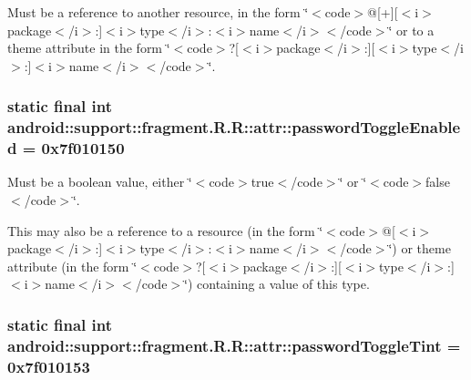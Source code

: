 Must be a reference to another resource, in the form \char`\"{}$<$code$>$@\mbox{[}+\mbox{]}\mbox{[}$<$i$>$package$<$/i$>$:\mbox{]}$<$i$>$type$<$/i$>$:$<$i$>$name$<$/i$>$$<$/code$>$\char`\"{} or to a theme attribute in the form \char`\"{}$<$code$>$?\mbox{[}$<$i$>$package$<$/i$>$:\mbox{]}\mbox{[}$<$i$>$type$<$/i$>$:\mbox{]}$<$i$>$name$<$/i$>$$<$/code$>$\char`\"{}. \hypertarget{classandroid_1_1support_1_1fragment_1_1_r_1_1attr_f5f65ed7d44e56e7258591514d5c15cf}{
\subsubsection[{passwordToggleEnabled}]{\setlength{\rightskip}{0pt plus 5cm}static final int android::support::fragment.R.R::attr::passwordToggleEnabled = 0x7f010150}}
\label{classandroid_1_1support_1_1fragment_1_1_r_1_1attr_f5f65ed7d44e56e7258591514d5c15cf}


Must be a boolean value, either \char`\"{}$<$code$>$true$<$/code$>$\char`\"{} or \char`\"{}$<$code$>$false$<$/code$>$\char`\"{}. 

This may also be a reference to a resource (in the form \char`\"{}$<$code$>$@\mbox{[}$<$i$>$package$<$/i$>$:\mbox{]}$<$i$>$type$<$/i$>$:$<$i$>$name$<$/i$>$$<$/code$>$\char`\"{}) or theme attribute (in the form \char`\"{}$<$code$>$?\mbox{[}$<$i$>$package$<$/i$>$:\mbox{]}\mbox{[}$<$i$>$type$<$/i$>$:\mbox{]}$<$i$>$name$<$/i$>$$<$/code$>$\char`\"{}) containing a value of this type. \hypertarget{classandroid_1_1support_1_1fragment_1_1_r_1_1attr_955ee3a49bc65fca0f6a04bca99e5801}{
\subsubsection[{passwordToggleTint}]{\setlength{\rightskip}{0pt plus 5cm}static final int android::support::fragment.R.R::attr::passwordToggleTint = 0x7f010153}}
\label{classandroid_1_1support_1_1fragment_1_1_r_1_1attr_955ee3a49bc65fca0f6a04bca99e5801}


